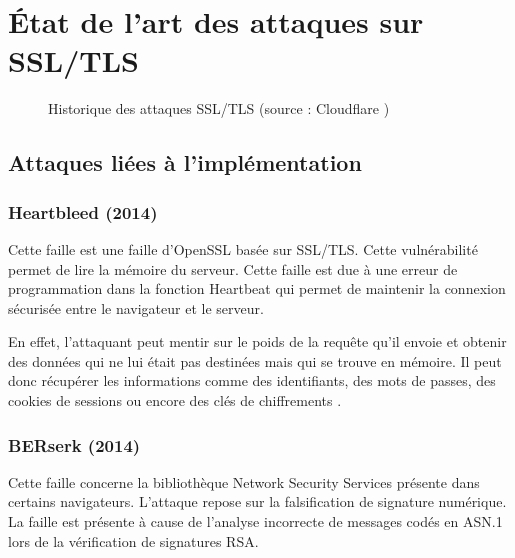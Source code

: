 \chapter{État de l'art des attaques sur SSL/TLS}

\begin{figure}[H]
  \caption{Historique des attaques SSL/TLS (source : Cloudflare \cite{cloudflare})}
\end{figure}

\section{Attaques liées à l'implémentation}

\subsection{Heartbleed (2014)}
Cette faille est une faille d'OpenSSL basée sur SSL/TLS. Cette vulnérabilité permet de lire la mémoire du serveur. Cette faille est due à une erreur de programmation dans la fonction Heartbeat qui permet de maintenir la connexion sécurisée entre le navigateur et le serveur.

En effet, l'attaquant peut mentir sur le poids de la requête qu'il envoie et obtenir des données qui ne lui était pas destinées mais qui se trouve en mémoire. Il peut donc récupérer les informations comme des identifiants, des mots de passes, des cookies de sessions ou encore des clés de chiffrements \cite{heartbleed}.

\subsection{BERserk (2014)}
Cette faille concerne la bibliothèque Network Security Services présente dans certains navigateurs. L'attaque repose sur la falsification de signature numérique. La faille est présente à cause de l'analyse incorrecte de messages codés en ASN.1 lors de la vérification de signatures RSA.

